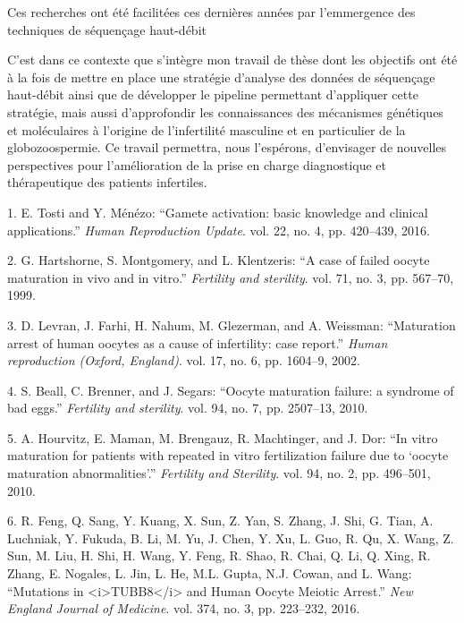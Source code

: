 \documentclass[12pt,a4paper,twoside]{ugathesis}
\theoremstyle{definition}
\theoremstyle{definition}
\theoremstyle{definition}
\theoremstyle{remark}
\begin{document}
Ces recherches ont été facilitées ces dernières années par l'emmergence
des techniques de séquençage haut-débit

C'est dans ce contexte que s'intègre mon travail de thèse dont les
objectifs ont été à la fois de mettre en place une stratégie d'analyse
des données de séquençage haut-débit ainsi que de développer le pipeline
permettant d'appliquer cette stratégie, mais aussi d'approfondir les
connaissances des mécanismes génétiques et moléculaires à l'origine de
l'infertilité masculine et en particulier de la globozoospermie. Ce
travail permettra, nous l'espérons, d'envisager de nouvelles
perspectives pour l'amélioration de la prise en charge diagnostique et
thérapeutique des patients infertiles.

\hypertarget{refs}{}
\hypertarget{ref-Tosti2016}{}
1. E. Tosti and Y. Ménézo: ``Gamete activation: basic knowledge and
clinical applications.'' \emph{Human Reproduction Update}. vol. 22, no.
4, pp. 420--439, 2016.

\hypertarget{ref-Hartshorne1999}{}
2. G. Hartshorne, S. Montgomery, and L. Klentzeris: ``A case of failed
oocyte maturation in vivo and in vitro.'' \emph{Fertility and
sterility}. vol. 71, no. 3, pp. 567--70, 1999.

\hypertarget{ref-Levran2002}{}
3. D. Levran, J. Farhi, H. Nahum, M. Glezerman, and A. Weissman:
``Maturation arrest of human oocytes as a cause of infertility: case
report.'' \emph{Human reproduction (Oxford, England)}. vol. 17, no. 6,
pp. 1604--9, 2002.

\hypertarget{ref-Beall2010}{}
4. S. Beall, C. Brenner, and J. Segars: ``Oocyte maturation failure: a
syndrome of bad eggs.'' \emph{Fertility and sterility}. vol. 94, no. 7,
pp. 2507--13, 2010.

\hypertarget{ref-Hourvitz2010}{}
5. A. Hourvitz, E. Maman, M. Brengauz, R. Machtinger, and J. Dor: ``In
vitro maturation for patients with repeated in vitro fertilization
failure due to `oocyte maturation abnormalities'.'' \emph{Fertility and
Sterility}. vol. 94, no. 2, pp. 496--501, 2010.

\hypertarget{ref-Feng2016}{}
6. R. Feng, Q. Sang, Y. Kuang, X. Sun, Z. Yan, S. Zhang, J. Shi, G.
Tian, A. Luchniak, Y. Fukuda, B. Li, M. Yu, J. Chen, Y. Xu, L. Guo, R.
Qu, X. Wang, Z. Sun, M. Liu, H. Shi, H. Wang, Y. Feng, R. Shao, R. Chai,
Q. Li, Q. Xing, R. Zhang, E. Nogales, L. Jin, L. He, M.L. Gupta, N.J.
Cowan, and L. Wang: ``Mutations in
\textless{}i\textgreater{}TUBB8\textless{}/i\textgreater{} and Human
Oocyte Meiotic Arrest.'' \emph{New England Journal of Medicine}. vol.
374, no. 3, pp. 223--232, 2016.
\end{document}
